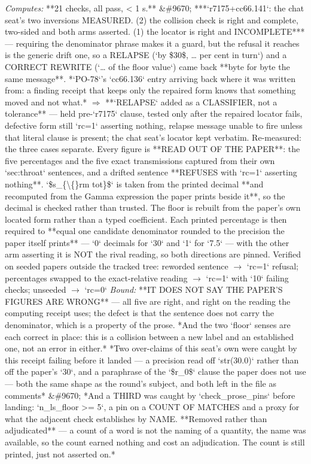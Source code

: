 \begin{description}
\emph{Computes:} **21 checks, all pass, < 1 s.** \&\#9670;  ***`r7175+cc66.141`: the chat seat's two inversions MEASURED. (2) the collision check is right and complete, two-sided and both arms asserted. (1) the locator is right and INCOMPLETE*** --- requiring the denominator phrase makes it a guard, but the refusal it reaches is the generic drift one, so a RELAPSE (`by \$30\$, \ldots{} per cent in turn`) and a CORRECT REWRITE (`\ldots{} of the floor value`) came back **byte for byte the same message**. *`PO-78`'s `cc66.136` entry arriving back where it was written from: a finding receipt that keeps only the repaired form knows that something moved and not what.* \ensuremath{\Rightarrow} **`RELAPSE` added as a CLASSIFIER, not a tolerance** --- held pre-`r7175` clause, tested only after the repaired locator fails, defective form still `rc=1` asserting nothing, relapse message unable to fire unless that literal clause is present; the chat seat's locator kept verbatim. Re-measured: the three cases separate. Every figure is **READ OUT OF THE PAPER**: the five percentages and the five exact transmissions captured from their own `sec:throat` sentences, and a drifted sentence **REFUSES with `rc=1` asserting nothing**. `\$s\_\{\textbackslash\{\}rm tot\}\$` is taken from the printed decimal **and recomputed from the Gamma expression the paper prints beside it**, so the decimal is checked rather than trusted. The floor is rebuilt from the paper's own located form rather than a typed coefficient. Each printed percentage is then required to **equal one candidate denominator rounded to the precision the paper itself prints** --- `0` decimals for `30` and `1` for `7.5` --- with the other arm asserting it is NOT the rival reading, so both directions are pinned. Verified on seeded papers outside the tracked tree: reworded sentence \ensuremath{\to} `rc=1` refusal; percentages swapped to the exact-relative reading \ensuremath{\to} `rc=1` with `10` failing checks; unseeded \ensuremath{\to} `rc=0`
 \emph{Bound:}  **IT DOES NOT SAY THE PAPER'S FIGURES ARE WRONG** --- all five are right, and right on the reading the computing receipt uses; the defect is that the sentence does not carry the denominator, which is a property of the prose.  *And the two `floor` senses are each correct in place: this is a collision between a new label and an established one, not an error in either.*  *Two over-claims of this seat's own were caught by this receipt failing before it landed --- a precision read off `str(30.0)` rather than off the paper's `30`, and a paraphrase of the `\$r\_0\$` clause the paper does not use --- both the same shape as the round's subject, and both left in the file as comments* \&\#9670;  *And a THIRD was caught by `check\_prose\_pins` before landing: `n\_ls\_floor >= 5`, a pin on a COUNT OF MATCHES and a proxy for what the adjacent check establishes by NAME. **Removed rather than adjudicated** --- a count of a word is not the naming of a quantity, the name was available, so the count earned nothing and cost an adjudication. The count is still printed, just not asserted on.*

\end{description}
